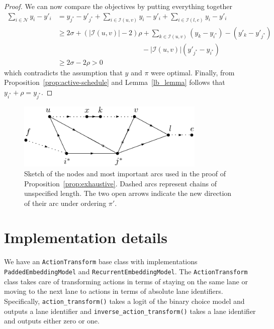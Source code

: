 \documentclass[a4paper]{article}
\theoremstyle{definition}
\theoremstyle{plain}
\begin{document}
\begin{proof}
  We can now compare the objectives by putting everything together
  \begin{align*}
    \sum_{i \in \mathcal{N}} y_{i} - y'_{i} &=  y_{j^{*}} - y'_{j^{*}} + \sum_{i \in \mathcal{I}(u, v)} y_{i} - y'_{i} + \sum_{i \in \mathcal{I}(l, e)} y_{i} - y'_{i} \\
    &\geq 2 \sigma + (|\mathcal{I}(u,v)| - 2) \rho + \sum_{k \in \mathcal{I}(u,v)} (y_{k} - y_{i^{*}}) - (y'_{k} - y'_{j^{*}}) \\ & \hspace{12em} - |\mathcal{I}(u,v)| (y'_{j^{*}} - y_{i^{*}}) \\
    &\geq 2 \sigma - 2 \rho > 0
  \end{align*}
  which contradicts the assumption that $y$ and $\pi$ were optimal.
  Finally, from Proposition~\ref{prop:active-schedule} and Lemma~\ref{lb_lemma}
  follows that $y_{i^{*}} + \rho = y_{j^{*}}$.
\end{proof}

\begin{figure}[H]
  \centering
  \includegraphics[width=0.8\textwidth]{figures/platoon-preservation-proof-diagram.pdf}
  \caption{Sketch of the nodes and most important arcs used in the proof of
    Proposition~\ref{prop:exhaustive}. Dashed arcs represent chains of
    unspecified length. The two open arrows indicate the new direction of their
    arc under ordering $\pi'$.}\label{fig:platoon-preservation-diagram}
\end{figure}


\section{Implementation details}

We have an \texttt{ActionTransform} base class with implementations
\texttt{PaddedEmbeddingModel} and \texttt{RecurrentEmbeddingModel}. The
\texttt{ActionTransform} class takes care of transforming actions in terms of
staying on the same lane or moving to the next lane to actions in terms of
absolute lane identifiers. Specifically, \texttt{action\_transform()} takes a
logit of the binary choice model and outputs a lane identifier and
\texttt{inverse\_action\_transform()} takes a lane identifier and outputs either
zero or one.
\end{document}
